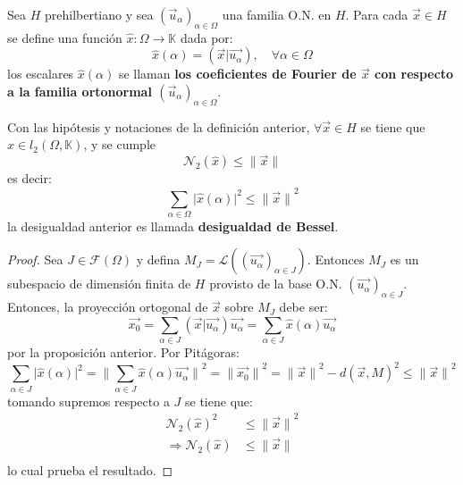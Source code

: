 \documentclass[12pt]{report}
\newcounter{it}
\theoremstyle{largebreak}
\newcommand\cf[3]{\ensuremath{#1:#2\rightarrow#3}}
\newcommand\abs[1]{\ensuremath{\big|#1\big|}}
\newcommand\norm[1]{\ensuremath{\|#1\|}}
\newcommand\pint[2]{\ensuremath{\left(#1\big| #2\right)}}
\begin{document}
    \begin{mydef}
        Sea $H$ prehilbertiano y sea $(\vec{u}_\alpha)_{\alpha\in\Omega}$ una familia O.N. en $H$. Para cada $\vec{x}\in H$ se define una función $\cf{\hat{x}}{\Omega}{\mathbb{K}}$ dada por:
        \begin{equation*}
            \hat{x}(\alpha)=\pint{\vec{x}}{\vec{u_\alpha}},\quad\forall\alpha\in\Omega
        \end{equation*}
        los escalares $\hat{x}(\alpha)$ se llaman \textbf{los coeficientes de Fourier de $\vec{x}$ con respecto a la familia ortonormal $(\vec{u}_\alpha)_{\alpha\in\Omega}$}.
    \end{mydef}

    \begin{theor}
        Con las hipótesis y notaciones de la definición anterior, $\forall\vec{x}\in H$ se tiene que $\hat{x}\in l_2(\Omega,\mathbb{K})$, y se cumple
        \begin{equation*}
            \mathcal{N}_2(\hat{x})\leq\norm{\vec{x}}
        \end{equation*}
        es decir:
        \begin{equation*}
            \sum_{\alpha\in\Omega}\abs{\hat{x}(\alpha)}^2\leq\norm{\vec{x}}^2
        \end{equation*}
        la desigualdad anterior es llamada \textbf{desigualdad de Bessel}.
    \end{theor}

    \begin{proof}
        Sea $J\in\mathcal{F}(\Omega)$ y defina $M_J=\mathcal{L}((\vec{u_\alpha})_{\alpha\in J})$. Entonces $M_J$ es un subespacio de dimensión finita de $H$ provisto de la base O.N. $(\vec{u_\alpha})_{\alpha\in J}$. Entonces, la proyección ortogonal de $\vec{x}$ sobre $M_J$ debe ser:
        \begin{equation*}
            \vec{x_0}=\sum_{\alpha\in J }\pint{\vec{x}}{\vec{u_\alpha}}\vec{u_\alpha}=\sum_{\alpha\in J }\hat{x}(\alpha)\vec{u_\alpha}
        \end{equation*}
        por la proposición anterior. Por Pitágoras:
        \begin{equation*}
            \sum_{\alpha\in J}\abs{\hat{x}(\alpha)}^2=\norm{\sum_{\alpha\in J}\hat{x}(\alpha)\vec{u_\alpha}}^2=\norm{\vec{x_0}}^2=\norm{\vec{x}}^2-d(\vec{x},M)^2\leq\norm{\vec{x}}^2
        \end{equation*}
        tomando supremos respecto a $J$ se tiene que:
        \begin{equation*}
            \begin{split}
                \mathcal{N}_2(\hat{x})^2&\leq\norm{\vec{x}}^2\\
                \Rightarrow \mathcal{N}_2(\hat{x})&\leq\norm{\vec{x}}\\
            \end{split}
        \end{equation*}
        lo cual prueba el resultado.
    \end{proof}
\end{document}
